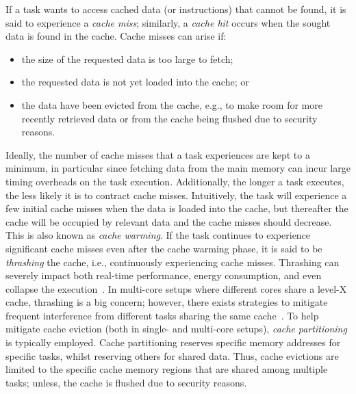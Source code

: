 If a task wants to access cached data (or instructions) that cannot be found, it is said to experience a \emph{cache miss}; similarly, a \emph{cache hit} occurs when the sought data is found in the cache.
Cache misses can arise if:
%
\begin{itemize}
    \item the size of the requested data is too large to fetch;
    \item the requested data is not yet loaded into the cache; or
    \item the data have been evicted from the cache, e.g., to make room for more recently retrieved data or from the cache being flushed due to security reasons.
\end{itemize}
%
Ideally, the number of cache misses that a task experiences are kept to a minimum, in particular since fetching data from the main memory can incur large timing overheads on the task execution.
Additionally, the longer a task executes, the less likely it is to contract cache misses.
Intuitively, the task will experience a few initial cache misses when the data is loaded into the cache, but thereafter the cache will be occupied by relevant data and the cache misses should decrease.
This is also known as \emph{cache warming}.
If the task continues to experience significant cache misses even after the cache warming phase, it is said to be \emph{thrashing} the cache, i.e., continuously experiencing cache misses.
Thrashing can severely impact both real-time performance, energy consumption, and even collapse the execution~\cite{Wadleigh:2000}.
In multi-core setups where different cores share a level-X cache, thrashing is a big concern; however, there exists strategies to mitigate frequent interference from different tasks sharing the same cache~\cite{Brandenburg:2011}.
To help mitigate cache eviction (both in single- and multi-core setups), \emph{cache partitioning} is typically employed.
Cache partitioning reserves specific memory addresses for specific tasks, whilst reserving others for shared data.
Thus, cache evictions are limited to the specific cache memory regions that are shared among multiple tasks; unless, the cache is flushed due to security reasons.


